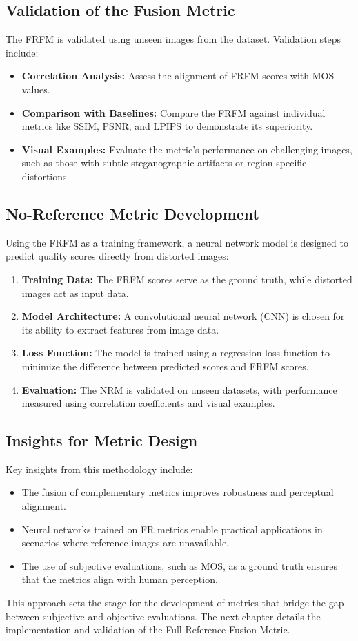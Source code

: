 \subsection{Validation of the Fusion Metric}

The FRFM is validated using unseen images from the dataset. Validation steps include:
\begin{itemize}
    \item \textbf{Correlation Analysis:} Assess the alignment of FRFM scores with MOS values.
    \item \textbf{Comparison with Baselines:} Compare the FRFM against individual metrics like SSIM, PSNR, and LPIPS to demonstrate its superiority.
    \item \textbf{Visual Examples:} Evaluate the metric's performance on challenging images, such as those with subtle steganographic artifacts or region-specific distortions.
\end{itemize}

\subsection{No-Reference Metric Development}

Using the FRFM as a training framework, a neural network model is designed to predict quality scores directly from distorted images:
\begin{enumerate}
    \item \textbf{Training Data:} The FRFM scores serve as the ground truth, while distorted images act as input data.
    \item \textbf{Model Architecture:} A convolutional neural network (CNN) is chosen for its ability to extract features from image data.
    \item \textbf{Loss Function:} The model is trained using a regression loss function to minimize the difference between predicted scores and FRFM scores.
    \item \textbf{Evaluation:} The NRM is validated on unseen datasets, with performance measured using correlation coefficients and visual examples.
\end{enumerate}

\subsection{Insights for Metric Design}

Key insights from this methodology include:
\begin{itemize}
    \item The fusion of complementary metrics improves robustness and perceptual alignment.
    \item Neural networks trained on FR metrics enable practical applications in scenarios where reference images are unavailable.
    \item The use of subjective evaluations, such as MOS, as a ground truth ensures that the metrics align with human perception.
\end{itemize}

This approach sets the stage for the development of metrics that bridge the gap between subjective and objective evaluations. The next chapter details the implementation and validation of the Full-Reference Fusion Metric.
